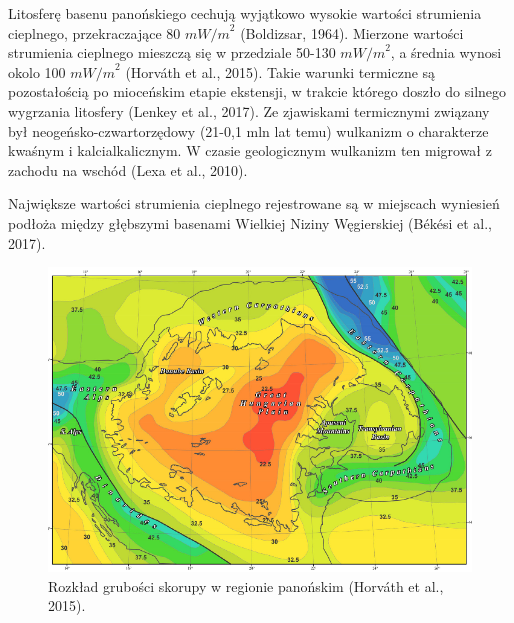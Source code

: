 \documentclass[11.5pt,twoside]{report}
\begin{document}
Litosferę basenu panońskiego cechują wyjątkowo wysokie wartości strumienia cieplnego, przekraczające 80 ${mW/m}^{2}$ (Boldizsar, 1964). Mierzone wartości strumienia cieplnego mieszczą się w przedziale 50-130 ${mW/m}^{2}$, a średnia wynosi okolo 100 ${mW/m}^{2}$ (Horv\'{a}th et al., 2015). Takie warunki termiczne są pozostałością po mioceńskim etapie ekstensji, w trakcie którego doszło do silnego wygrzania litosfery (Lenkey et al., 2017). Ze zjawiskami termicznymi związany był neogeńsko-czwartorzędowy (21-0,1 mln lat temu) wulkanizm o charakterze kwaśnym i kalcialkalicznym. W czasie geologicznym wulkanizm ten migrował z zachodu na wschód (Lexa et al., 2010). 

Największe wartości strumienia cieplnego rejestrowane są w miejscach wyniesień podłoża między głębszymi basenami Wielkiej Niziny Węgierskiej (B\'{e}k\'{e}si et al., 2017). 

\begin{figure}[h]
	\centering
	\includegraphics[width=0.7\linewidth]{"../Termika/grubosc skorupy"}
	\caption{Rozkład grubości skorupy w regionie panońskim (Horváth et al., 2015).}
	\label{fig:grubosc-skorupy}
\end{figure}
\end{document}
